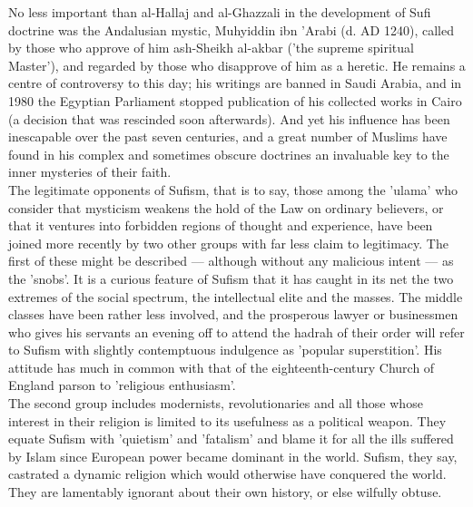 \documentclass[10pt, twoside,openright]{book}
\begin{document}
No less important than al\hyp{}Hallaj and al\hyp{}Ghazzali in the development of Sufi doctrine was the 
Andalusian mystic, Muhyiddin ibn 'Arabi (d. AD 1240), called by those who approve of him ash\hyp{}Sheikh 
al\hyp{}akbar ('the supreme spiritual Master'), and regarded by those who disapprove of him as a heretic. 
He remains a centre of controversy to this day; his writings are banned in Saudi Arabia, and in 1980 
the Egyptian Parliament stopped publication of his collected works in Cairo (a decision that was 
rescinded soon afterwards). And yet his influence has been inescapable over the past seven centuries, 
and a great number of Muslims have found in his complex and sometimes obscure doctrines an invaluable 
key to the inner mysteries of their faith. \\

The legitimate opponents of Sufism, that is to say, those among the 'ulama' who consider that 
mysticism weakens the hold of the Law on ordinary believers, or that it ventures into forbidden 
regions of thought and experience, have been joined more recently by two other groups with far less 
claim to legitimacy. The first of these might be described --- although without any malicious intent --- 
as the 'snobs'. It is a curious feature of Sufism that it has caught in its net the two extremes of 
the social spectrum, the intellectual elite and the masses. The middle classes have been rather less 
involved, and the prosperous lawyer or businessmen who gives his servants an evening off to attend 
the hadrah of their order will refer to Sufism with slightly contemptuous indulgence as 'popular 
superstition'. His attitude has much in common with that of the eighteenth\hyp{}century Church of England 
parson to 'religious enthusiasm'. \\

The second group includes modernists, revolutionaries and all those whose interest in their religion 
is limited to its usefulness as a political weapon. They equate Sufism with 'quietism' and 'fatalism' 
and blame it for all the ills suffered by Islam since European power became dominant in the world. 
Sufism, they say, castrated a dynamic religion which would otherwise have conquered the world. They 
are lamentably ignorant about their own history, or else wilfully obtuse. \\
\end{document}
